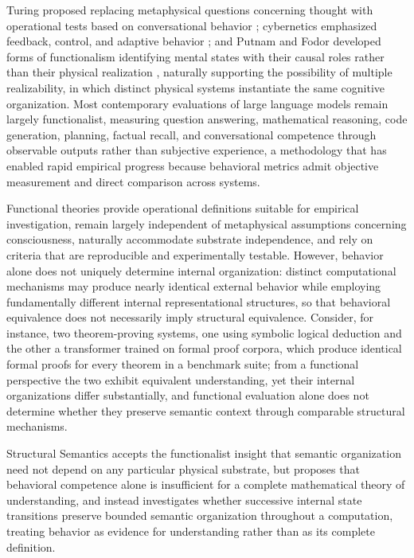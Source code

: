\documentclass[11pt,twoside,openright]{book}
\numberwithin{equation}{chapter}
\theoremstyle{definition}
\theoremstyle{plain}
\theoremstyle{remark}
\theoremstyle{definition}
\begin{document}
Turing proposed replacing metaphysical questions concerning thought with
operational tests based on conversational behavior \cite{Turing1950};
cybernetics emphasized feedback, control, and adaptive behavior
\cite{Wiener1948,Ashby1956}; and Putnam and Fodor developed forms of
functionalism identifying mental states with their causal roles rather
than their physical realization \cite{Putnam1967,Fodor1975}, naturally
supporting the possibility of multiple realizability, in which distinct
physical systems instantiate the same cognitive organization. Most
contemporary evaluations of large language models remain largely
functionalist, measuring question answering, mathematical reasoning, code
generation, planning, factual recall, and conversational competence
through observable outputs rather than subjective experience, a
methodology that has enabled rapid empirical progress because behavioral
metrics admit objective measurement and direct comparison across systems.

Functional theories provide operational definitions suitable for
empirical investigation, remain largely independent of metaphysical
assumptions concerning consciousness, naturally accommodate substrate
independence, and rely on criteria that are reproducible and
experimentally testable. However, behavior alone does not uniquely
determine internal organization: distinct computational mechanisms may
produce nearly identical external behavior while employing fundamentally
different internal representational structures, so that behavioral
equivalence does not necessarily imply structural equivalence. Consider,
for instance, two theorem-proving systems, one using symbolic logical
deduction and the other a transformer trained on formal proof corpora,
which produce identical formal proofs for every theorem in a benchmark
suite; from a functional perspective the two exhibit equivalent
understanding, yet their internal organizations differ substantially, and
functional evaluation alone does not determine whether they preserve
semantic context through comparable structural mechanisms.

Structural Semantics accepts the functionalist insight that semantic
organization need not depend on any particular physical substrate, but
proposes that behavioral competence alone is insufficient for a complete
mathematical theory of understanding, and instead investigates whether
successive internal state transitions preserve bounded semantic
organization throughout a computation, treating behavior as evidence for
understanding rather than as its complete definition.
\end{document}
